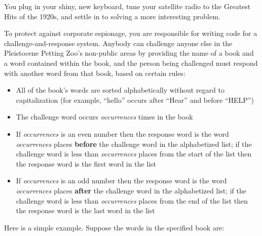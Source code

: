 You plug in your shiny, new keyboard, tune your satellite radio to the Greatest Hits of the 1920s, and settle in to solving a more interesting problem.

To protect against corporate espionage, you are responsible for writing code for a challenge-and-response system.
Anybody can challenge anyone else in the Pleistocene Petting Zoo's non-public areas by providing the name of a book and a word contained within the book, and the person being challenged must respond with another word from that book, based on certain rules:
\begin{itemize}
    \item All of the book's words are sorted alphabetically without regard to capitalization (for example, ``hello'' occurs after ``Hear'' and before ``HELP'')
    \item The challenge word occurs \textit{occurrences} times in the book
    \item If \textit{occurrences} is an even number then the response word is the word \textit{occurrences} places \textbf{before} the challenge word in the alphabetized list;
        if the challenge word is less than \textit{occurrences} places from the start of the list then the response word is the first word in the list
    \item If \textit{occurrences} is an odd number then the response word is the word \textit{occurrences} places \textbf{after} the challenge word in the alphabetized list;
        if the challenge word is less than \textit{occurrences} places from the end of the list then the response word is the last word in the list
\end{itemize}

Here is a simple example.
Suppose the words in the specified book are:

